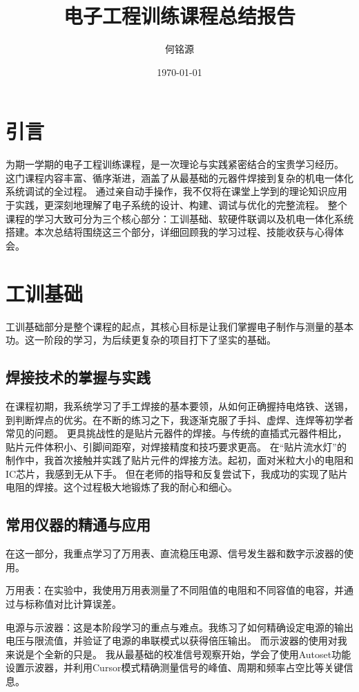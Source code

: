 \documentclass[UTF8]{ctexart}
\title{电子工程训练课程总结报告}
\author{何铭源}
\date{\today}
\begin{document}
\maketitle
\section{引言}
为期一学期的电子工程训练课程，是一次理论与实践紧密结合的宝贵学习经历。
这门课程内容丰富、循序渐进，涵盖了从最基础的元器件焊接到复杂的机电一体化系统调试的全过程。
通过亲自动手操作，我不仅将在课堂上学到的理论知识应用于实践，更深刻地理解了电子系统的设计、构建、调试与优化的完整流程。
整个课程的学习大致可分为三个核心部分：工训基础、软硬件联调以及机电一体化系统搭建。本次总结将围绕这三个部分，详细回顾我的学习过程、技能收获与心得体会。

\section{工训基础}
工训基础部分是整个课程的起点，其核心目标是让我们掌握电子制作与测量的基本功。这一阶段的学习，为后续更复杂的项目打下了坚实的基础。

\subsection{焊接技术的掌握与实践}
在课程初期，我系统学习了手工焊接的基本要领，从如何正确握持电烙铁、送锡，到判断焊点的优劣。在不断的练习之下，我逐渐克服了手抖、虚焊、连焊等初学者常见的问题。
更具挑战性的是贴片元器件的焊接。与传统的直插式元器件相比，贴片元件体积小、引脚间距窄，对焊接精度和技巧要求更高。
在“贴片流水灯”的制作中，我首次接触并实践了贴片元件的焊接方法。起初，面对米粒大小的电阻和IC芯片，我感到无从下手。
但在老师的指导和反复尝试下，我成功的实现了贴片电阻的焊接。这个过程极大地锻炼了我的耐心和细心。

\subsection{常用仪器的精通与应用}
在这一部分，我重点学习了万用表、直流稳压电源、信号发生器和数字示波器的使用。

万用表：在实验中，我使用万用表测量了不同阻值的电阻和不同容值的电容，并通过与标称值对比计算误差。

电源与示波器：这是本阶段学习的重点与难点。我练习了如何精确设定电源的输出电压与限流值，并验证了电源的串联模式以获得倍压输出。
而示波器的使用对我来说是个全新的只是。
我从最基础的校准信号观察开始，学会了使用Autoset功能设置示波器，并利用Cursor模式精确测量信号的峰值、周期和频率占空比等关键信息。
\end{document}
